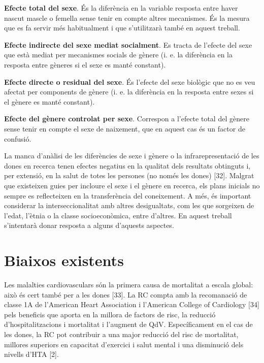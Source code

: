 \documentclass[CAT]{TFUOC}%
\begin{document}
\bigskip

\textbf{Efecte total del sexe}. És la diferència en la variable resposta entre haver nascut mascle o femella sense tenir en compte altres mecanismes. És la mesura que es fa servir més habitualment i que s'utilitzarà també en aquest treball.

\textbf{Efecte indirecte del sexe mediat socialment}. Es tracta de l'efecte del sexe que està mediat per mecanismes socials de gènere (i. e. la diferència en la resposta entre gèneres si el sexe es manté constant).

\textbf{Efecte directe o residual del sexe}. És l'efecte del sexe biològic que no es veu afectat per components de gènere (i. e. la diferència en la resposta entre sexes si el gènere es manté constant).

\textbf{Efecte del gènere controlat per sexe}. Correspon a l'efecte total del gènere sense tenir en compte el sexe de naixement, que en aquest cas és un factor de confusió.

\bigskip

La manca d'anàlisi de les diferències de sexe i gènere o la infrarepresentació de les dones en recerca tenen efectes negatius en la qualitat dels resultats obtinguts i, per extensió, en la salut de totes les persones (no només les dones) {[}32{]}. Malgrat que existeixen guies per incloure el sexe i el gènere en recerca, els plans inicials no sempre es reflecteixen en la transferència del coneixement. A més, és important considerar la interseccionalitat amb altres desigualtats, com les que sorgeixen de l'edat, l'ètnia o la classe socioeconòmica, entre d'altres. En aquest treball s'intentarà donar resposta a alguns d'aquests aspectes.

\section{Biaixos existents}\label{biaixos-existents}

Les malalties cardiovasculars són la primera causa de mortalitat a escala global: això és cert també per a les dones {[}33{]}. La RC compta amb la recomanació de classe 1A de l'American Heart Association i l'American College of Cardiology {[}34{]} pels beneficis que aporta en la millora de factors de risc, la reducció d'hospitalitzacions i mortalitat i l'augment de QdV. Específicament en el cas de les dones, la RC pot contribuir a una major reducció del risc de mortalitat, millores superiors en capacitat d'exercici i salut mental i una disminució dels nivells d'HTA {[}2{]}.
\end{document}
